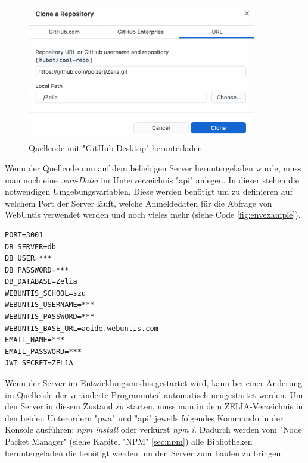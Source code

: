 \begin{figure}[H]
    \centering
    \includegraphics[width=100mm]{media/Handbuch/clone_gh.png}
    \caption{Quellcode mit "GitHub Desktop" herunterladen}
    \label{fig:clonewithdesktop}
\end{figure}


Wenn der Quellcode nun auf dem beliebigen Server heruntergeladen wurde, muss man noch eine \emph{.env-Datei} im Unterverzeichnis "api" anlegen. In dieser stehen die notwendigen Umgebungsvariablen. Diese werden benötigt um zu definieren auf welchem Port der Server läuft, welche Anmeldedaten für die Abfrage von WebUntis verwendet werden und noch vieles mehr (siehe Code \ref{fig:envexample}).


\begin{singlespace}
    \begin{lstlisting}[caption={Beispiel einer .env-Datei},label={fig:envexample},captionpos=b]
PORT=3001
DB_SERVER=db
DB_USER=***
DB_PASSWORD=***
DB_DATABASE=Zelia
WEBUNTIS_SCHOOL=szu
WEBUNTIS_USERNAME=***
WEBUNTIS_PASSWORD=***
WEBUNTIS_BASE_URL=aoide.webuntis.com
EMAIL_NAME=***
EMAIL_PASSWORD=***
JWT_SECRET=ZEL1A
    \end{lstlisting}
\end{singlespace}


Wenn der Server im Entwicklungsmodus gestartet wird, kann bei einer Änderung im Quellcode der veränderte Programmteil automatisch neugestartet werden. Um den Server in diesem Zustand zu starten, muss man in dem ZELIA-Verzeichnis in den beiden Unterordern "pwa" und "api" jeweils folgendes Kommando in der Konsole ausführen: \emph{npm install} oder verkürzt \emph{npm i}. Dadurch werden vom "Node Packet Manager" (siehe Kapitel "NPM" \ref{sec:npm}) alle Bibliotheken heruntergeladen die benötigt werden um den Server zum Laufen zu bringen.

